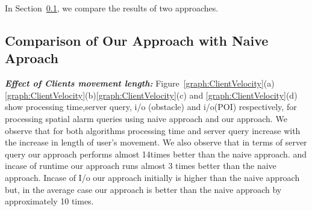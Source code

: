 In Section~\ref{subsec:naive}, we compare the results of two approaches.


\subsection{Comparison of Our Approach with Naive Aproach}
\label{subsec:naive}
\textbf{\emph{Effect of Clients movement length: }}Figure~\ref{graph:ClientVelocity}(a) \ref{graph:ClientVelocity}(b)\ref{graph:ClientVelocity}(c) and \ref{graph:ClientVelocity}(d) show processing time,server query, i/o (obstacle) and i/o(POI) respectively, for processing spatial alarm queries using naive approach and our approach. We observe that for both algorithms processing time and server query increase with the increase in length of user's movement. We also observe that in terms of server query our approach performs almost 14times better than the naive approach. and incase of runtime our approach runs almost 3 times better than the naive approach. Incase of I/o our approach initially is higher than the naive approach but, in the average case our approach is better than the naive approach by approximately 10 times.

\vspace*{10pt}

